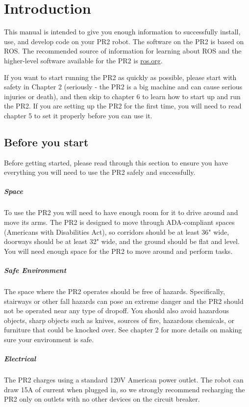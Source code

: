 \chapter {Introduction}
This manual is intended to give you enough information to successfully install, use, and develop code on your PR2 robot.  The software on the PR2 is based on ROS.  The recommended source of information for learning about ROS and the higher-level software available for the PR2 is \href{http://ros.org}{ros.org}.

If you want to start running the PR2 as quickly as possible, please start with safety in Chapter 2 (seriously - the PR2 is a big machine and can cause serious injuries or death), and then skip to chapter 6 to learn how to start up and run the PR2.  If you are setting up the PR2 for the first time, you will need to read chapter 5 to set it properly before you can use it.

\section{Before you start}
Before getting started, please read through this section to ensure you have everything you will need to use the PR2 safely and successfully.
\paragraph{Space} To use the PR2 you will need to have enough room for it to drive around and move its arms.  The PR2 is designed to move through ADA-compliant spaces (Americans with Disabilities Act), so corridors should be at least 36" wide, doorways should be at least 32" wide, and the ground should be flat and level.  You will need enough space for the PR2 to move around and perform tasks.
\paragraph{Safe Environment} The space where the PR2 operates should be free of hazards.  Specifically, stairways or other fall hazards can pose an extreme danger and the PR2 should not be operated near any type of dropoff.  You should also avoid hazardous objects, sharp objects such as knives, sources of fire, hazardous chemicals, or furniture that could be knocked over.  See chapter 2 for more details on making sure your environment is safe.
\paragraph{Electrical} The PR2 charges using a standard 120V American power outlet.  The robot can draw 15A of current when plugged in, so we strongly recommend recharging the PR2 only on outlets with no other devices on the circuit breaker.
